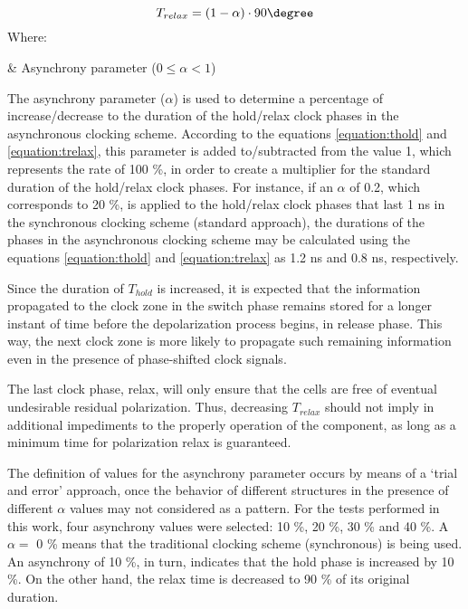 \begin{equation}
T_{relax} = (1-\alpha)\cdot90 \degree
\label{equation:trelax}
\end{equation}
Where:
\begin{conditions*}
\alpha  &  Asynchrony parameter ($0 \leq \alpha < 1$)\\
\end{conditions*}

The asynchrony parameter ($\alpha$) is used to determine a percentage of increase/decrease to the duration of the hold/relax clock phases in the asynchronous clocking scheme. According to the equations \ref{equation:thold} and \ref{equation:trelax}, this parameter is added to/subtracted from the value 1, which represents the rate of 100 \%, in order to create a multiplier for the standard duration of the hold/relax clock phases. For instance, if an $\alpha$ of 0.2, which corresponds to 20 \%, is applied to the hold/relax clock phases that last 1 ns in the synchronous clocking scheme (standard approach), the durations of the phases in the asynchronous clocking scheme may be calculated using the equations \ref{equation:thold} and \ref{equation:trelax} as 1.2 ns and 0.8 ns, respectively.

Since the duration of $T_{hold}$ is increased, it is expected that the information propagated to the clock zone in the switch phase remains stored for a longer instant of time before the depolarization process begins, in release phase. This way, the next clock zone is more likely to propagate such remaining information even in the presence of phase-shifted clock signals.

The last clock phase, relax, will only ensure that the cells are free of eventual undesirable residual polarization. Thus, decreasing $T_{relax}$ should not imply in additional impediments to the properly operation of the component, as long as a minimum time for polarization relax is guaranteed.

The definition of values for the asynchrony parameter occurs by means of a `trial and error' approach, once the behavior of different structures in the presence of different $\alpha$ values may not considered as a pattern. For the tests performed in this work, four asynchrony values were selected: 10 \%, 20 \%, 30 \% and 40 \%. A $\alpha =$ 0 \% means that the traditional clocking scheme (synchronous) is being used. An asynchrony of 10 \%, in turn, indicates that the hold phase is increased by 10 \%. On the other hand, the relax time is decreased to 90 \% of its original duration.

